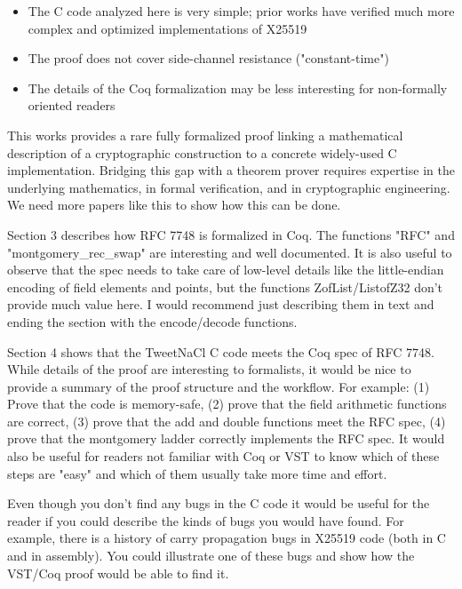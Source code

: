 \begin{itemize}
    \item The C code analyzed here is very simple; prior works have verified much more complex and optimized implementations of X25519
    \item The proof does not cover side-channel resistance ("constant-time")
    \item The details of the Coq formalization may be less interesting for non-formally oriented readers
\end{itemize}

\begin{center}
\end{center}
This works provides a rare fully formalized proof linking a mathematical description of a cryptographic construction to a concrete widely-used C implementation. Bridging this gap with a theorem prover requires expertise in the underlying mathematics, in formal verification, and in cryptographic engineering. We need more papers like this to show how this can be done.

Section 3 describes how RFC 7748 is formalized in Coq. The functions "RFC" and "montgomery\_rec\_swap" are interesting and well documented. It is also useful to observe that the spec needs to take care of low-level details like the little-endian encoding of field elements and points, but the functions ZofList/ListofZ32 don't provide much value here. I would recommend just describing them in text and ending the section with the encode/decode functions.

Section 4 shows that the TweetNaCl C code meets the Coq spec of RFC 7748. While details of the proof are interesting to formalists, it would be nice to provide a summary of the proof structure and the workflow. For example: (1) Prove that the code is memory-safe, (2) prove that the field arithmetic functions are correct, (3) prove that the add and double functions meet the RFC spec, (4) prove that the montgomery ladder correctly implements the RFC spec. It would also be useful for readers not familiar with Coq or VST to know which of these steps are "easy" and which of them usually take more time and effort.

Even though you don't find any bugs in the C code it would be useful for the reader if you could describe the kinds of bugs you would have found. For example, there is a history of carry propagation bugs in X25519 code (both in C and in assembly). You could illustrate one of these bugs and show how the VST/Coq proof would be able to find it.

